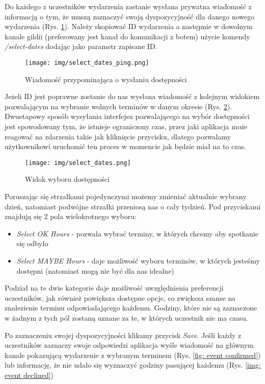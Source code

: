 \documentclass[11pt,a4paper]{article}
\begin{document}
Do każdego z uczestników wydarzenia zastanie wysłana prywatna wiadomość z informacją o tym, że muszą zaznaczyć swoją dyspozycyjność dla danego nowego wydarzenia (Rys. \ref{fig: select dates ping}). Należy skopiować ID wydarzenia a następnie w dowolnym kanale gildii (preferowany jest kanał do komunikacji z botem) użycie komendy \textit{/select-dates} dodając jako parametr zapisane ID.

\begin{figure}[H]
    \centering
    \texttt{[image: img/select\_dates\_ping.png]}
    \caption{Wiadomość przypominająca o wysłaniu dostępności}
    \label{fig: select dates ping}
\end{figure}

Jeżeli ID jest poprawne zostanie do nas wysłana wiadomość z kolejnym widokiem pozwalającym na wybranie wolnych terminów w danym okresie (Rys. \ref{fig: select dates}). Dwuetapowy sposób wysyłania interfejsu pozwalającego na wybór dostępności jest spowodowany tym, że istnieje ograniczony czas, przez jaki aplikacja może reagować na zdarzenia takie jak kliknięcie przycisku, dlatego pozwalamy użytkownikowi uruchomić ten proces w momencie jak będzie miał na to czas.

\begin{figure}[H]
    \centering
    \texttt{[image: img/select\_dates.png]}
    \caption{Widok wyboru dostępności}
    \label{fig: select dates}
\end{figure}

Poruszając się strzałkami pojedynczymi możemy zmieniać aktualnie wybrany dzień, natomiast podwójne strzałki przeniosą nas o cały tydzień. Pod przyciskami znajdują się 2 pola wielokrotnego wyboru:
\begin{itemize}
    \item \textit{Select OK Hours} - pozwala wybrać terminy, w których chcemy aby spotkanie się odbyło
    \item \textit{Select MAYBE Hours} - daje możliwość wyboru terminów, w których jesteśmy dostępni (natomiast mogą nie być dla nas idealne)
\end{itemize}

Podział na te dwie kategorie daje możliwość uwzględnienia preferencji uczestników, jak również powiększa dostępne opcje, co zwiększa szanse na znalezienie terminu odpowiadającego każdemu. Godziny, które nie są zaznaczone w żadnym z tych pól zostaną uznane za te, w których uczestnik nie ma czasu.

Po zaznaczeniu swojej dyspozycyjności klikamy przycisk \textit{Save}. Jeśli każdy z uczestników zaznaczy swoje odpowiedzi aplikacja wyśle wiadomość na głównym kanale pokazującą wydarzenie z wybranym terminem (Rys. \ref{fig: event confirmed}) lub informację, że nie udało się wyznaczyć godziny pasującej każdemu (Rys. \ref{img: event declined})
\end{document}
